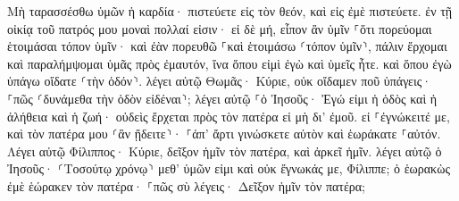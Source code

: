 \documentclass{openreader}
\begin{document}
Μὴ ταρασσέσθω ὑμῶν ἡ καρδία· πιστεύετε εἰς τὸν θεόν, καὶ εἰς ἐμὲ πιστεύετε. 
ἐν τῇ οἰκίᾳ τοῦ πατρός μου μοναὶ πολλαί εἰσιν· εἰ δὲ μή, εἶπον ἂν ὑμῖν ⸀ὅτι πορεύομαι ἑτοιμάσαι τόπον ὑμῖν· 
καὶ ἐὰν πορευθῶ ⸀καὶ ἑτοιμάσω ⸂τόπον ὑμῖν⸃, πάλιν ἔρχομαι καὶ παραλήμψομαι ὑμᾶς πρὸς ἐμαυτόν, ἵνα ὅπου εἰμὶ ἐγὼ καὶ ὑμεῖς ἦτε. 
καὶ ὅπου ἐγὼ ὑπάγω οἴδατε ⸂τὴν ὁδόν⸃. 
λέγει αὐτῷ Θωμᾶς· Κύριε, οὐκ οἴδαμεν ποῦ ὑπάγεις· ⸀πῶς ⸂δυνάμεθα τὴν ὁδὸν εἰδέναι⸃; 
λέγει αὐτῷ ⸀ὁ Ἰησοῦς· Ἐγώ εἰμι ἡ ὁδὸς καὶ ἡ ἀλήθεια καὶ ἡ ζωή· οὐδεὶς ἔρχεται πρὸς τὸν πατέρα εἰ μὴ δι’ ἐμοῦ. 
εἰ ⸀ἐγνώκειτέ με, καὶ τὸν πατέρα μου ⸂ἂν ᾔδειτε⸃· ⸀ἀπ’ ἄρτι γινώσκετε αὐτὸν καὶ ἑωράκατε ⸀αὐτόν. 
Λέγει αὐτῷ Φίλιππος· Κύριε, δεῖξον ἡμῖν τὸν πατέρα, καὶ ἀρκεῖ ἡμῖν. 
λέγει αὐτῷ ὁ Ἰησοῦς· ⸂Τοσούτῳ χρόνῳ⸃ μεθ’ ὑμῶν εἰμι καὶ οὐκ ἔγνωκάς με, Φίλιππε; ὁ ἑωρακὼς ἐμὲ ἑώρακεν τὸν πατέρα· ⸀πῶς σὺ λέγεις· Δεῖξον ἡμῖν τὸν πατέρα; 
\end{document}
